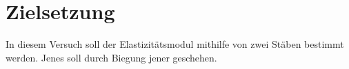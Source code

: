 \section{Zielsetzung}
\label{sec:Zielsetzung}
In diesem Versuch soll der Elastizitätsmodul mithilfe von zwei Stäben bestimmt
werden. Jenes soll durch Biegung jener geschehen.